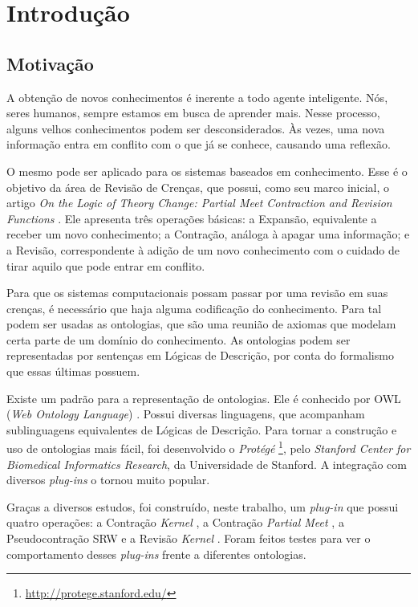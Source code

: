 \chapter{Introdução}

\section{Motivação}

A obtenção de novos conhecimentos é inerente a todo agente inteligente. Nós, seres humanos, sempre estamos em busca de aprender mais. Nesse processo, alguns velhos conhecimentos podem ser desconsiderados. Às vezes, uma nova informação entra em conflito com o que já se conhece, causando uma reflexão.

O mesmo pode ser aplicado para os sistemas baseados em conhecimento. Esse é o objetivo da área de Revisão de Crenças, que possui, como seu marco inicial, o artigo \textit{On the Logic of Theory Change: Partial Meet Contraction and Revision Functions} \citep{revisaoAGM}. Ele apresenta três operações básicas: a Expansão, equivalente a receber um novo conhecimento; a Contração, análoga à apagar uma informação; e a Revisão, correspondente à adição de um novo conhecimento com o cuidado de tirar aquilo que pode entrar em conflito.

Para que os sistemas computacionais possam passar por uma revisão em suas crenças, é necessário que haja alguma codificação do conhecimento. Para tal podem ser usadas as ontologias, que são uma reunião de axiomas que modelam certa parte de um domínio do conhecimento. As ontologias podem ser representadas por sentenças em Lógicas de Descrição, por conta do formalismo que essas últimas possuem.

Existe um padrão para a representação de ontologias. Ele é conhecido por OWL (\textit{Web Ontology Language}) \citep{ferramentasOWL2}. Possui diversas linguagens, que acompanham sublinguagens equivalentes de Lógicas de Descrição. Para tornar a construção e uso de ontologias mais fácil, foi desenvolvido o \textit{Protégé} \footnote{\url{http://protege.stanford.edu/}}, pelo \textit{Stanford Center for Biomedical Informatics Research}, da Universidade de Stanford. A integração com diversos \textit{plug-ins} o tornou muito popular.  

Graças a diversos estudos, foi construído, neste trabalho, um \textit{plug-in} que possui quatro operações: a Contração \textit{Kernel} \citep{revisaoHansson5}, a Contração \textit{Partial Meet} \citep{revisaoAGM}, a Pseu\-do\-con\-tra\-ção SRW \citep{revisaoSantos} e a Revisão \textit{Kernel} \citep{revisaoRibeiro2}. Foram feitos testes para ver o comportamento desses \textit{plug-ins} frente a diferentes ontologias.

